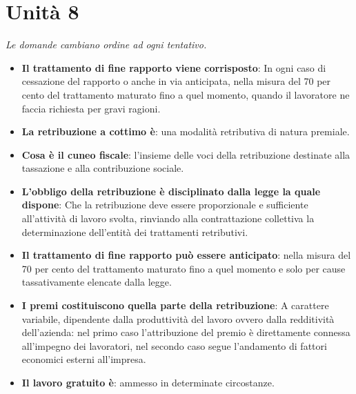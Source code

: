 \documentclass[12pt, a4paper]{report}
\begin{document}
\chapter{Unità 8}
    \textit{Le domande cambiano ordine ad ogni tentativo.}
    \begin{itemize}
        \item \textbf{Il trattamento di fine rapporto viene corrisposto}: In ogni caso di cessazione del rapporto o anche in via anticipata, nella misura del 70 per cento del trattamento maturato fino a quel momento, quando il lavoratore ne faccia richiesta per gravi ragioni.
        \item \textbf{La retribuzione a cottimo è}: una modalità retributiva di natura premiale.
        \item \textbf{Cosa è il cuneo fiscale}: l’insieme delle voci della retribuzione destinate alla tassazione e alla contribuzione sociale.
        \item \textbf{L’obbligo della retribuzione è disciplinato dalla legge la quale dispone}: Che la retribuzione deve essere proporzionale e sufficiente all’attività di lavoro svolta, rinviando alla contrattazione collettiva la determinazione dell’entità dei trattamenti retributivi.
        \item \textbf{Il trattamento di fine rapporto può essere anticipato}: nella misura del 70 per cento del trattamento maturato fino a quel momento e solo per cause tassativamente elencate dalla legge.
        \item \textbf{I premi costituiscono quella parte della retribuzione}: A carattere variabile, dipendente dalla produttività del lavoro ovvero dalla redditività dell’azienda: nel primo caso l’attribuzione del premio è direttamente connessa all’impegno dei lavoratori, nel secondo caso segue l’andamento di fattori economici esterni all’impresa.
        \item \textbf{Il lavoro gratuito è}: ammesso in determinate circostanze.
    \end{itemize}
\end{document}
